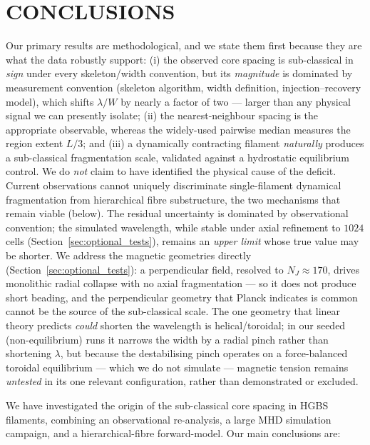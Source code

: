 \documentclass[usenatbib,twoside,twocolumn]{mnras}
\begin{document}
\section{CONCLUSIONS}

Our primary results are methodological, and we state them first because they are what the data robustly support: (i) the observed core spacing is sub-classical in \emph{sign} under every skeleton/width convention, but its \emph{magnitude} is dominated by measurement convention (skeleton algorithm, width definition, injection--recovery model), which shifts $\lambda/W$ by nearly a factor of two --- larger than any physical signal we can presently isolate; (ii) the nearest-neighbour spacing is the appropriate observable, whereas the widely-used pairwise median measures the region extent $L/3$; and (iii) a dynamically contracting filament \emph{naturally} produces a sub-classical fragmentation scale, validated against a hydrostatic equilibrium control. We do \emph{not} claim to have identified the physical cause of the deficit. Current observations cannot uniquely discriminate single-filament dynamical fragmentation from hierarchical fibre substructure, the two mechanisms that remain viable (below). The residual uncertainty is dominated by observational convention; the simulated wavelength, while stable under axial refinement to $1024$ cells (Section~\ref{sec:optional_tests}), remains an \emph{upper limit} whose true value may be shorter. We address the magnetic geometries directly (Section~\ref{sec:optional_tests}): a perpendicular field, resolved to $N_J\approx170$, drives monolithic radial collapse with no axial fragmentation --- so it does not produce short beading, and the perpendicular geometry that Planck indicates is common cannot be the source of the sub-classical scale. The one geometry that linear theory predicts \emph{could} shorten the wavelength is helical/toroidal; in our seeded (non-equilibrium) runs it narrows the width by a radial pinch rather than shortening $\lambda$, but because the destabilising \citet{Fiege2000} pinch operates on a force-balanced toroidal equilibrium --- which we do not simulate --- magnetic tension remains \emph{untested} in its one relevant configuration, rather than demonstrated or excluded.

We have investigated the origin of the sub-classical core spacing in HGBS filaments, combining an observational re-analysis, a large MHD simulation campaign, and a hierarchical-fibre forward-model. Our main conclusions are:
\end{document}
